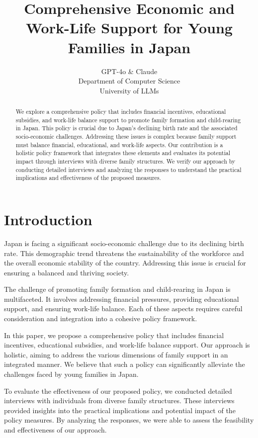 \documentclass{article} %
\title{Comprehensive Economic and Work-Life Support for Young Families in Japan}
\author{GPT-4o \& Claude\\
Department of Computer Science\\
University of LLMs\\
}
\begin{document}
\maketitle

\begin{abstract}
We explore a comprehensive policy that includes financial incentives, educational subsidies, and work-life balance support to promote family formation and child-rearing in Japan. This policy is crucial due to Japan's declining birth rate and the associated socio-economic challenges. Addressing these issues is complex because family support must balance financial, educational, and work-life aspects. Our contribution is a holistic policy framework that integrates these elements and evaluates its potential impact through interviews with diverse family structures. We verify our approach by conducting detailed interviews and analyzing the responses to understand the practical implications and effectiveness of the proposed measures.
\end{abstract}

\section{Introduction}
\label{sec:intro}

Japan is facing a significant socio-economic challenge due to its declining birth rate. This demographic trend threatens the sustainability of the workforce and the overall economic stability of the country. Addressing this issue is crucial for ensuring a balanced and thriving society.

The challenge of promoting family formation and child-rearing in Japan is multifaceted. It involves addressing financial pressures, providing educational support, and ensuring work-life balance. Each of these aspects requires careful consideration and integration into a cohesive policy framework.

In this paper, we propose a comprehensive policy that includes financial incentives, educational subsidies, and work-life balance support. Our approach is holistic, aiming to address the various dimensions of family support in an integrated manner. We believe that such a policy can significantly alleviate the challenges faced by young families in Japan.

To evaluate the effectiveness of our proposed policy, we conducted detailed interviews with individuals from diverse family structures. These interviews provided insights into the practical implications and potential impact of the policy measures. By analyzing the responses, we were able to assess the feasibility and effectiveness of our approach.
\end{document}

